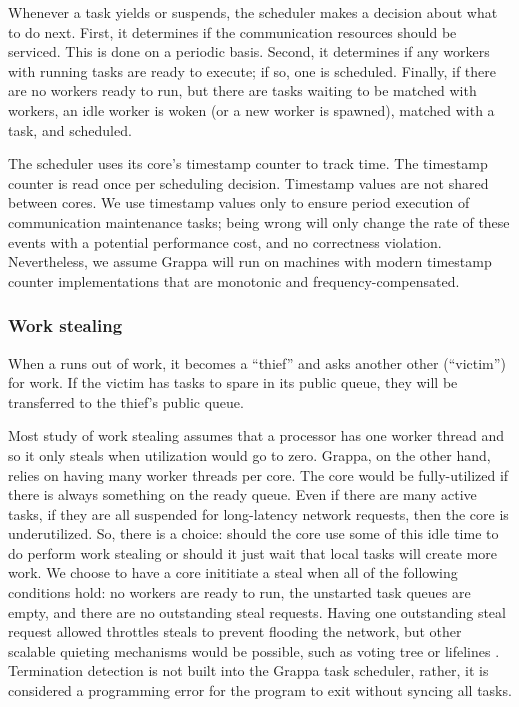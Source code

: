 Whenever a task yields or suspends, the scheduler makes a decision
about what to do next. First, it determines if
the communication resources should be serviced. This is done on a
periodic basis. Second, it determines if any workers with running
tasks are ready to execute; if so, one is scheduled. Finally, if there
are no workers ready to run, but there are tasks waiting to be matched
with workers, an idle worker is woken (or a new worker is spawned),
matched with a task, and scheduled.

The scheduler uses its core's timestamp counter to track time. The
timestamp counter is read once per scheduling decision. Timestamp
values are not shared between cores. We use timestamp values only to
ensure period execution of communication maintenance tasks; being
wrong will only change the rate of these events with a potential
performance cost, and no correctness violation. Nevertheless, we
assume Grappa will run on machines with modern timestamp counter
implementations that are monotonic and frequency-compensated.

\subsubsection{Work stealing} \label{subsec:implementation-worksteal}
When a  runs
out of work, it becomes a ``thief'' and asks another other
 (``victim'') for work. If the victim has tasks
to spare in its public queue, they will be transferred to the thief's public queue.

Most study of work stealing assumes that a processor has one worker
thread and so it only steals when utilization would go to zero. 
Grappa, on the other hand, relies on having many worker threads per core. The
core would be fully-utilized if there is always something on the ready
queue. Even if there are many active tasks, if they are all suspended
for long-latency network requests, then the core is underutilized.
So, there is a choice: should the core use some of this idle time to
do perform work stealing or should it just wait that local tasks will
create more work. We choose to have a core inititiate a steal when all
of the following conditions hold: no workers are ready to run, 
the unstarted task queues are empty, and there are no outstanding steal requests. 
Having one outstanding steal request allowed throttles steals to
prevent flooding the network, but other scalable quieting mechanisms
would be possible, such as voting tree\cite{scalable work stealing or
cilk98} or lifelines \cite{lifelines}. Termination detection is not
built into the Grappa task scheduler, rather, it is considered a programming error for
the program to exit without syncing all tasks.

